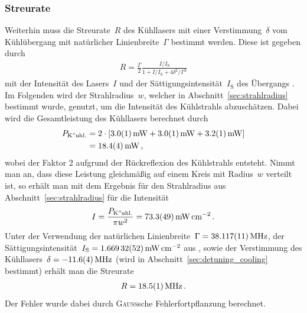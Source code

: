 \documentclass[11pt, a4paper]{article}
\numberwithin{equation}{section}
\begin{document}
\subsubsection{Streurate}
Weiterhin muss die Streurate~$R$ des Kühllasers mit einer Verstimmung~$\delta$ vom Kühlübergang mit natürlicher Linienbreite~$\Gamma$ bestimmt werden.
Diese ist gegeben durch
\begin{align*}
	R = \frac{\Gamma}{2} \frac{I / I_\mathrm{S}}{1 + I / I_\mathrm{S} + 4 \delta^2 / \Gamma^2}
\end{align*}
mit der Intensität des Lasers~$I$ und der Sättigungsintensität~$I_\mathrm{S}$ des Übergangs \cite{foot}.
Im Folgenden wird der Strahlradius~$w$, welcher in Abschnitt~\ref{sec:strahlradius} bestimmt wurde, genutzt, um die Intensität des Kühlstrahls abzuschätzen.
Dabei wird die Gesamtleistung des Kühllasers berechnet durch
\begin{align*}
	P_\mathrm{K"uhl.} &= 2 \cdot \left[ \SI{3.0 +- 0.1}{mW} + \SI{3.0 +- 0.1}{mW} + \SI{3.2 +- 0.1}{mW} \right]\\
	  &= \SI{18.4 +- 0.4}{mW} \, \text{,}
\end{align*} 
wobei der Faktor 2 aufgrund der Rückreflexion des Kühlstrahls entsteht.
Nimmt man an, dass diese Leistung gleichmäßig auf einem Kreis mit Radius~$w$ verteilt ist, so erhält man mit dem Ergebnis für den Strahlradius aus Abschnitt~\ref{sec:strahlradius} für die Intensität
\begin{align*}
	I = \frac{P_\mathrm{K"uhl.}}{\pi w^2} = \SI{73.3 +- 4.9}{\milli\watt\per\centi\meter\squared} \, \text{.}
\end{align*}
Unter der Verwendung der natürlichen Linienbreite~$\Gamma = \SI{38.117+-0.011}{MHz}$, der Sättigungsintensität~$I_\mathrm{S} = \SI{1.66932 +- 0.00052}{\milli\watt\per\centi\meter\squared}$ aus \cite{steck}, sowie der Verstimmung des Kühllasers~$\delta = \SI{-11.6+- 0.4}{MHz}$ (wird in Abschnitt~\ref{sec:detuning_cooling} bestimmt) erhält man die Streurate
\begin{align*}
	R = \SI{18.5 +- 0.1}{MHz} \, \text{.}
\end{align*}
Der Fehler wurde dabei durch \textsc{Gauß}sche Fehlerfortpflanzung berechnet.
\end{document}
